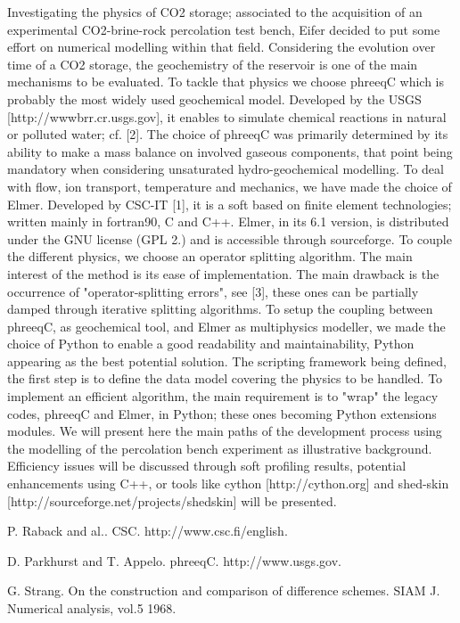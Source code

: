 Investigating the physics of CO2 storage; associated to the acquisition of an experimental CO2-brine-rock percolation test bench, Eifer decided to put some effort on numerical modelling within that field.
Considering the evolution over time of a CO2 storage, the geochemistry of the reservoir is one of the main mechanisms to be evaluated. To tackle that physics we choose phreeqC which is probably the most widely used geochemical model. Developed by the USGS [http://wwwbrr.cr.usgs.gov], it enables to simulate chemical reactions in natural or polluted water; cf. [2]. The choice of phreeqC was primarily determined by its ability to make a mass balance on involved gaseous components, that point being mandatory when considering unsaturated hydro-geochemical modelling. 
To deal with flow, ion transport, temperature and mechanics, we have made the choice of Elmer. Developed by CSC-IT [1], it is a soft based on finite element technologies; written mainly in fortran90, C and C++. Elmer, in its 6.1 version, is distributed under the GNU license (GPL 2.) and is accessible through sourceforge.
To couple the different physics, we choose an operator splitting algorithm. The main interest of the method is its ease of implementation. The main drawback is the occurrence of "operator-splitting errors", see [3], these ones can be partially damped through iterative splitting algorithms.
To setup the coupling between phreeqC, as geochemical tool, and Elmer as multiphysics modeller, we made the choice of Python to enable a good readability and maintainability, Python appearing as the best potential solution. The scripting framework being defined, the first step is to define the data model covering the physics to be handled. 
To implement an efficient algorithm, the main requirement is to "wrap" the legacy codes, phreeqC and Elmer,  in Python; these ones becoming Python extensions modules. 
We will present here the main paths of the development process using the modelling of the percolation bench experiment as illustrative background. Efficiency issues will be discussed through soft profiling results, potential enhancements using C++, or tools like cython [http://cython.org] and shed-skin [http://sourceforge.net/projects/shedskin] will be presented.



\begin{thebibliography}{10}

{\sc P. Raback and al.}. {CSC}. http://www.csc.fi/english.



{\sc D. Parkhurst and T. Appelo}. {phreeqC}. http://www.usgs.gov.



{\sc G. Strang}. {On the construction and comparison of difference schemes}. SIAM J. Numerical analysis, vol.5 1968.

\end{thebibliography}
